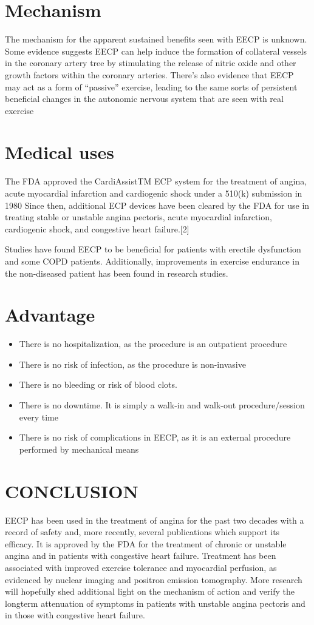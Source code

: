 \documentclass[11pt]{article}
\begin{document}
\section*{Mechanism}
The mechanism for the apparent sustained benefits seen with EECP is unknown. Some evidence suggests EECP can help induce the formation of collateral vessels in the coronary artery tree by stimulating the release of nitric oxide and other growth factors within the coronary arteries.
There's also evidence that EECP may act as a form of “passive” exercise, leading to the same sorts of persistent beneficial changes in the autonomic nervous system that are seen with real exercise
\section*{Medical uses}
The FDA approved the CardiAssistTM ECP system for the treatment of angina, acute myocardial infarction and cardiogenic shock under a 510(k) submission in 1980 Since then, additional ECP devices have been cleared by the FDA for use in treating stable or unstable angina pectoris, acute myocardial infarction, cardiogenic shock, and congestive heart failure.[2]

Studies have found EECP to be beneficial for patients with erectile dysfunction and some COPD patients. Additionally, improvements in exercise endurance in the non-diseased patient has been found in research studies.
\section*{Advantage}
\begin{itemize}
\item There is no hospitalization, as the procedure is an outpatient procedure
\item There is no risk of infection, as the procedure is non-invasive
\item There is no bleeding or risk of blood clots.
\item There is no downtime. It is simply a walk-in and walk-out procedure/session every time
\item  There is no risk of complications in EECP, as it is an external procedure performed by mechanical means

\end{itemize}
\section*{CONCLUSION}
EECP has been used in the treatment of angina for the past two decades with a record of safety and, more recently, several publications which support its efficacy. It is approved by the FDA for the treatment of chronic or unstable angina and in patients with congestive heart failure. Treatment has been associated with improved exercise tolerance and myocardial perfusion, as evidenced by nuclear imaging and positron emission tomography. More research will hopefully shed additional light on the mechanism of action and verify the longterm attenuation of symptoms in patients with unstable angina pectoris and in those with congestive heart failure.
\end{document}
